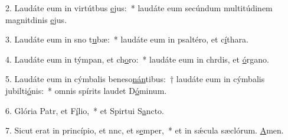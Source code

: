 2. Laudáte eum in virtútbus \uline{e}jus:~* laudáte eum secúndum multitúdinem magnitdinis \uline{e}jus.\par 
3. Laudáte eum in sno t\uline{u}bæ:~* laudáte eum in psaltéro, et c\uline{í}thara.\par 
4. Laudáte eum in týmpan, et ch\uline{o}ro:~* laudáte eum in chrdis, et \uline{ó}rgano.\par 
5. Laudáte eum in cýmbalis beneso\uline{nán}tibus:~† laudáte eum in cýmbalis jubilti\uline{ó}nis:~* omnis spírits laudet D\uline{ó}minum.\par 
6. Glória Patr, et F\uline{í}lio,~* et Spirtui S\uline{a}ncto.\par 
7. Sicut erat in princípio, et nnc, et s\uline{e}mper,~* et in sǽcula sæclórum. \uline{A}men.\par 

